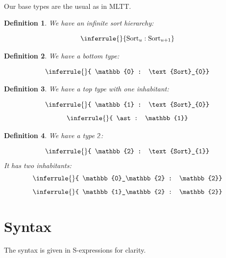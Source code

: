\documentclass{article}
\newtheorem{definition}{Definition}
\newcommand{\sort}[1]{\text{Sort}_{#1}}
\begin{document}
Our base types are the usual as in MLTT.

\begin{definition}
  We have an infinite sort hierarchy:

  \begin{equation}
  \inferrule
  { }
  { \sort{u} : \sort{u + 1}}
  \end{equation}
\end{definition}

\begin{definition}
  We have a bottom type:

  \begin{equation}
  \inferrule
  { }
  { \mathbb{0} : \sort{0}}
  \end{equation}
\end{definition}

\begin{definition}
  We have a top type with one inhabitant:

  \begin{equation}
  \inferrule
  { }
  { \mathbb{1} : \sort{0}}
\end{equation}
\begin{equation}
  \inferrule
  { }
  { \ast : \mathbb{1}}
  \end{equation}
\end{definition}

\begin{definition}
  We have a type \(\mathbb{2}\):

  \begin{equation}
  \inferrule
  { }
  { \mathbb{2} : \sort{1}}
\end{equation}
It has two inhabitants:
\begin{equation}
  \inferrule
  { }
  { \mathbb{0}_\mathbb{2} : \mathbb{2}}
\end{equation}
\begin{equation}
  \inferrule
  { }
  { \mathbb{1}_\mathbb{2} : \mathbb{2}}
  \end{equation}
\end{definition}

\section{Syntax}

The syntax is given in S-expressions for clarity.
\end{document}
